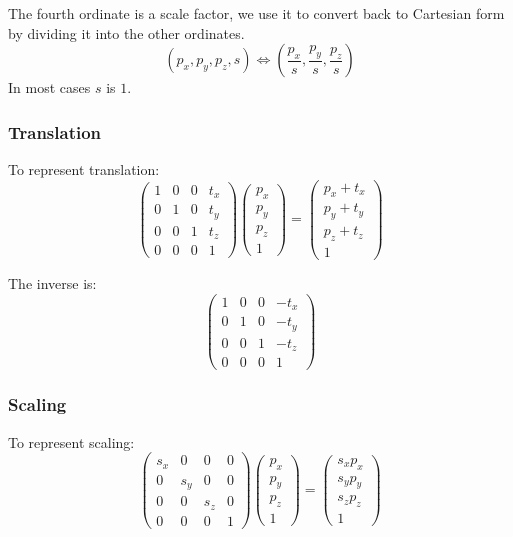 \documentclass[11pt]{article}
\begin{document}
The fourth ordinate is a scale factor, we use it to convert back to Cartesian form by dividing it into the other ordinates.
\[
  (p_x, p_y, p_z, s) \Leftrightarrow (\frac{p_x}{s}, \frac{p_y}{s}, \frac{p_z}{s})
\]
In most cases $s$ is $1$.

\subsubsection{Translation}
To represent translation:
\[
  \begin{pmatrix}
    1 & 0 & 0 & t_x \\
    0 & 1 & 0 & t_y \\
    0 & 0 & 1 & t_z \\
    0 & 0 & 0 & 1
  \end{pmatrix}
  \begin{pmatrix}
    p_x \\
    p_y \\
    p_z \\
    1
  \end{pmatrix}
  =
  \begin{pmatrix}
    p_x + t_x \\
    p_y + t_y \\
    p_z + t_z \\
    1
  \end{pmatrix}
\]

The inverse is:
\[
  \begin{pmatrix}
    1 & 0 & 0 & -t_x \\
    0 & 1 & 0 & -t_y \\
    0 & 0 & 1 & -t_z \\
    0 & 0 & 0 & 1
  \end{pmatrix}
\]

\subsubsection{Scaling}
To represent scaling:
\[
  \begin{pmatrix}
    s_x & 0 & 0 & 0 \\
    0 & s_y & 0 & 0 \\
    0 & 0 & s_z & 0 \\
    0 & 0 & 0 & 1
  \end{pmatrix}
  \begin{pmatrix}
    p_x \\
    p_y \\
    p_z \\
    1
  \end{pmatrix}
  =
  \begin{pmatrix}
    s_xp_x \\
    s_yp_y \\
    s_zp_z \\
    1
  \end{pmatrix}
\]
\end{document}
